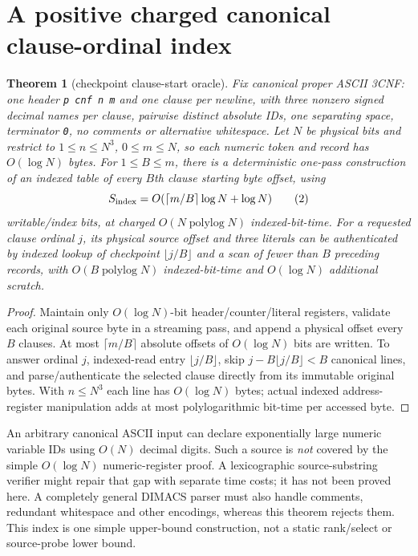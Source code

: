 \documentclass[11pt]{article}
\newtheorem{theorem}{Theorem}
\begin{document}
\section{A positive charged canonical clause-ordinal index}
\begin{theorem}[checkpoint clause-start oracle]\label{th:checkpoint}
Fix canonical proper ASCII 3CNF: one header \texttt{p cnf n m} and one clause per newline, with three nonzero signed decimal names per clause, pairwise distinct absolute IDs, one separating space, terminator \texttt{0}, no comments or alternative whitespace. Let $N$ be physical \emph{bits} and restrict to $1\le n\le N^3$, $0\le m\le N$, so each numeric token and record has $O(\log N)$ bytes. For $1\le B\le m$, there is a deterministic one-pass construction of an indexed table of every $B$th clause starting byte offset, using
\[
S_{\rm index}=O(\lceil m/B\rceil\log N+\log N)
\tag{2}
\]
writable/index bits, at charged $O(N\operatorname{polylog}N)$ indexed-bit-time. For a requested clause ordinal $j$, its physical source offset and three literals can be authenticated by indexed lookup of checkpoint $\lfloor j/B\rfloor$ and a scan of fewer than $B$ preceding records, with $O(B\operatorname{polylog}N)$ indexed-bit-time and $O(\log N)$ additional scratch.
\end{theorem}
\begin{proof}
Maintain only $O(\log N)$-bit header/counter/literal registers, validate each original source byte in a streaming pass, and append a physical offset every $B$ clauses. At most $\lceil m/B\rceil$ absolute offsets of $O(\log N)$ bits are written. To answer ordinal $j$, indexed-read entry $\lfloor j/B\rfloor$, skip $j-B\lfloor j/B\rfloor<B$ canonical lines, and parse/authenticate the selected clause directly from its immutable original bytes. With $n\le N^3$ each line has $O(\log N)$ bytes; actual indexed address-register manipulation adds at most polylogarithmic bit-time per accessed byte.
\end{proof}
An arbitrary canonical ASCII input can declare exponentially large numeric variable IDs using $O(N)$ decimal digits. Such a source is \emph{not} covered by the simple $O(\log N)$ numeric-register proof. A lexicographic source-substring verifier might repair that gap with separate time costs; it has not been proved here. A completely general DIMACS parser must also handle comments, redundant whitespace and other encodings, whereas this theorem rejects them. This index is one simple upper-bound construction, not a static rank/select or source-probe lower bound.
\end{document}
